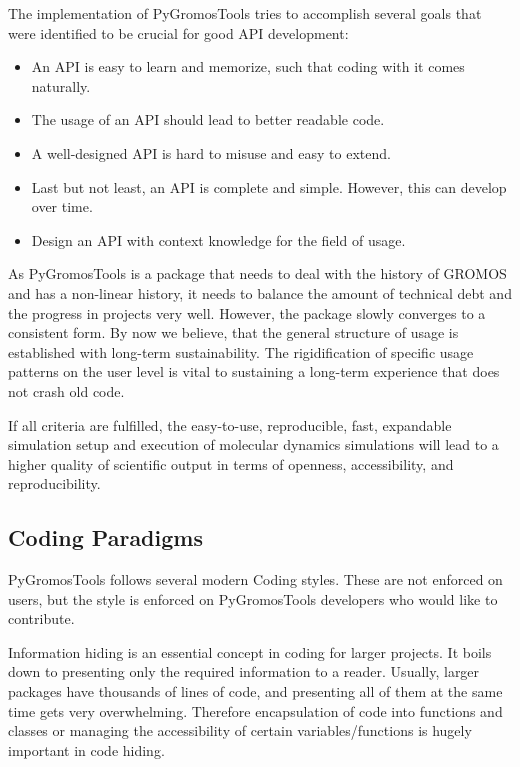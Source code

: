 The implementation of  PyGromosTools tries to accomplish several goals that were identified to be crucial for good API development: \cite{Henning2009, Blanchette2008, Bloch2006}
\begin{itemize}
    \item An API is easy to learn and memorize, such that coding with it comes naturally. 
    \item The usage of an API should lead to better readable code.
    \item A well-designed API is hard to misuse and easy to extend.
    \item Last but not least, an API is complete and simple. However, this can develop over time.
    \item Design an API with context knowledge for the field of usage. 
\end{itemize}

As PyGromosTools is a package that needs to deal with the history of GROMOS and has a non-linear history, it needs to balance the amount of technical debt and the progress in projects very well. However, the package slowly converges to a consistent form. By now we believe, that the general structure of usage is established with long-term sustainability.
The rigidification of specific usage patterns on the user level is vital to sustaining a long-term experience that does not crash old code.  

If all criteria are fulfilled, the easy-to-use, reproducible, fast, expandable simulation setup and execution of molecular dynamics simulations will lead to a higher quality of scientific output in terms of openness, accessibility, and reproducibility.

\subsection{Coding Paradigms}
PyGromosTools follows several modern Coding styles. These are not enforced on users, but the style is enforced on PyGromosTools developers who would like to contribute. 

Information hiding is an essential concept in coding for larger projects. It boils down to presenting only the required information to a reader. Usually, larger packages have thousands of lines of code, and presenting all of them at the same time gets very overwhelming. Therefore encapsulation of code into functions and classes or managing the accessibility of certain variables/functions is hugely important in code hiding. \cite{} 

